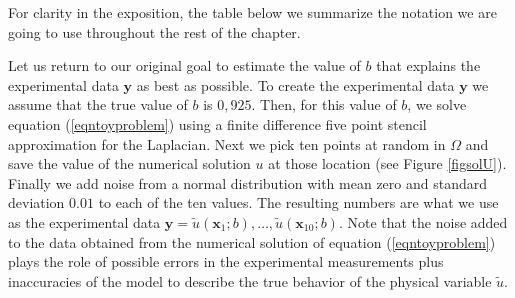 \documentclass[12pt]{book}
\newcommand{\x}{\textbf{x}}
\newcommand{\y}{\textbf{y}}
\begin{document}
For clarity in the exposition, the table below we summarize the notation 
we are going to use throughout the rest of the chapter.





%
Let us return to our original goal  to estimate the value of $b$ that explains  the experimental data 
$\y$ as best as possible. To create the experimental data $\y$ we 
assume that the true value of $b$ is $0,925$. Then, for this value of $b$,  we solve equation (\ref{eqntoyproblem})
using a finite difference five point  stencil approximation for the Laplacian. 
Next we pick  ten points at random in $\Omega$ and save the value of the numerical 
solution $u$ at those location (see Figure \ref{figsolU}).  Finally we add  noise from
a normal distribution with mean zero and standard deviation $0.01$ to each  of the ten values. 
The resulting numbers  are what we use
as the experimental data $\y={\tilde{u}(\x_{1};b),\ldots,\tilde{u}(\x_{10};b)}$. 
Note that the noise added to the data obtained from the
numerical  solution of equation
(\ref{eqntoyproblem}) plays the role of possible  
errors in the experimental measurements plus inaccuracies of the 
model to describe the true behavior of the physical variable $\tilde{u}$.
\end{document}
